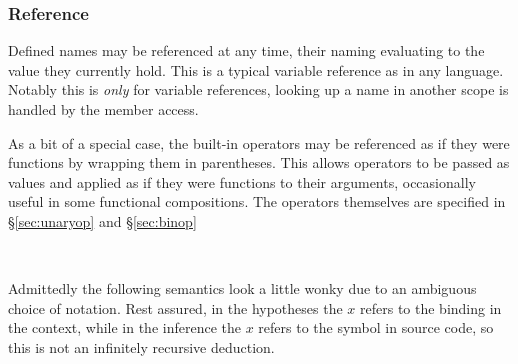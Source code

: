 \subsubsection{Reference}

Defined names may be referenced at any time, their naming evaluating to the value
they currently hold. This is a typical variable reference as in any language.
Notably this is \emph{only} for variable references, looking up a name in another
scope is handled by the member access.

As a bit of a special case, the built-in operators may be referenced as if they
were functions by wrapping them in parentheses. This allows operators to be passed
as values and applied as if they were functions to their arguments, occasionally
useful in some functional compositions. The operators themselves are specified
in \S\ref{sec:unaryop} and \S\ref{sec:binop}

\begin{bnf*}
     \\
\end{bnf*}

Admittedly the following semantics look a little wonky due to an ambiguous choice
of notation. Rest assured, in the hypotheses the $x$ refers to the binding in the
context, while in the inference the $x$ refers to the symbol in source code, so
this is not an infinitely recursive deduction.

\begin{prooftree}
\end{prooftree}


